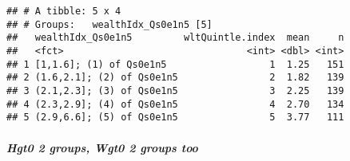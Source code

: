 \documentclass[
]{article}
\newenvironment{Shaded}{\begin{snugshade}}{\end{snugshade}}
\newcommand{\CommentTok}[1]{\textcolor[rgb]{0.56,0.35,0.01}{\textit{#1}}}
\newcommand{\DataTypeTok}[1]{\textcolor[rgb]{0.13,0.29,0.53}{#1}}
\newcommand{\DecValTok}[1]{\textcolor[rgb]{0.00,0.00,0.81}{#1}}
\newcommand{\FloatTok}[1]{\textcolor[rgb]{0.00,0.00,0.81}{#1}}
\newcommand{\KeywordTok}[1]{\textcolor[rgb]{0.13,0.29,0.53}{\textbf{#1}}}
\newcommand{\NormalTok}[1]{#1}
\newcommand{\OperatorTok}[1]{\textcolor[rgb]{0.81,0.36,0.00}{\textbf{#1}}}
\newcommand{\OtherTok}[1]{\textcolor[rgb]{0.56,0.35,0.01}{#1}}
\newcommand{\StringTok}[1]{\textcolor[rgb]{0.31,0.60,0.02}{#1}}
\begin{document}
\begin{Shaded}
\end{Shaded}

\begin{verbatim}
## # A tibble: 5 x 4
## # Groups:   wealthIdx_Qs0e1n5 [5]
##   wealthIdx_Qs0e1n5         wltQuintle.index  mean     n
##   <fct>                                <int> <dbl> <int>
## 1 [1,1.6]; (1) of Qs0e1n5                  1  1.25   151
## 2 (1.6,2.1]; (2) of Qs0e1n5                2  1.82   139
## 3 (2.1,2.3]; (3) of Qs0e1n5                3  2.25   139
## 4 (2.3,2.9]; (4) of Qs0e1n5                4  2.70   134
## 5 (2.9,6.6]; (5) of Qs0e1n5                5  3.77   111
\end{verbatim}

\hypertarget{hgt0-2-groups-wgt0-2-groups-too}{%
\subparagraph{Hgt0 2 groups, Wgt0 2 groups
too}\label{hgt0-2-groups-wgt0-2-groups-too}}
\end{document}
